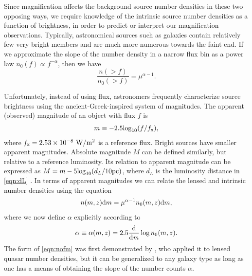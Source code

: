 Since magnification affects the background source number densities in these two opposing ways, we require knowledge of the intrinsic source number densities as a function of brightness, in order to predict or interpret our magnification observations. Typically, astronomical sources such as galaxies contain relatively few very bright members and are much more numerous towards the faint end. If we approximate the slope of the number density in a narrow flux bin as a power law $n_0(f) \propto f^{-\alpha}$, then we have
\begin{equation}
\frac{n(>f)}{n_0(>f)} = \mu^{\alpha-1}.
\end{equation}

Unfortunately, instead of using flux, astronomers frequently characterize source brightness using the ancient-Greek-inspired system of magnitudes. The apparent (observed) magnitude of an object with flux $f$ is
\begin{equation}
m \equiv -2.5 {\rm log}_{10}(f/f_{\rm x}),
\end{equation}
where $f_{\rm x} = 2.53 \times 10^{-8} \ {\rm W}/{\rm m}^2$ is a reference flux. Bright sources have smaller apparent magnitudes. Absolute magnitude $M$ can be defined similarly, but relative to a reference luminosity. Its relation to apparent magnitude can be expressed as $M=m-5{\rm log}_{10}(d_L/10{\rm pc})$, where $d_L$ is the luminosity distance in \autoref{eqn:dL} \citep{RydenText}. In terms of apparent magnitudes we can relate the lensed and intrinsic number densities using the equation
\begin{equation}
\label{eqn:nofm}
n(m,z){\rm d}m = \mu^{\alpha -1} n_0(m,z){\rm d}m,
\end{equation}
where we now define $\alpha$ explicitly according to
\begin{equation}
\alpha \equiv \alpha(m,z) = 2.5 \frac{\mathrm d}{\mathrm d \it m} \log n_0(m,z).
\label{alpha}
\end{equation}
The form of \autoref{eqn:nofm} was first demonstrated by \citet{Narayan89}, who applied it to lensed quasar number densities, but it can be generalized to any galaxy type as long as one has a means of obtaining the slope of the number counts $\alpha$.

